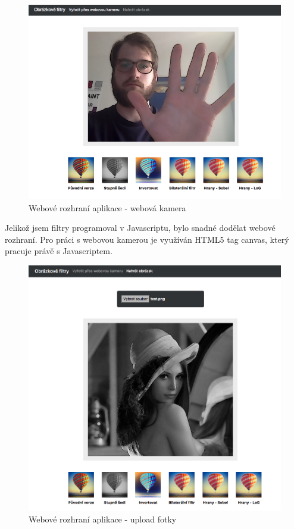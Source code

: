 \documentclass[11pt,oneside]{article}
\begin{document}
\begin{figure}[!htb]
\centering
\includegraphics[width=1.0\textwidth]{web-screen-01.png}
\caption{Webové rozhraní aplikace - webová kamera}
\end{figure}

Jelikož jsem filtry programoval v Javascriptu, bylo snadné dodělat webové rozhraní. Pro práci s webovou kamerou je využíván HTML5 tag canvas, který pracuje právě s Javascriptem.

\begin{figure}[!h]
\centering
\includegraphics[width=1.0\textwidth]{web-screen-02.png}
\caption{Webové rozhraní aplikace - upload fotky}
\end{figure}
\end{document}
